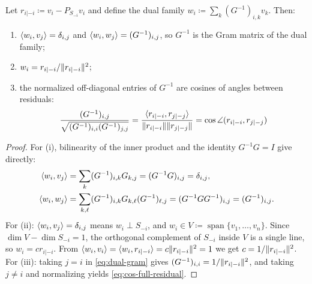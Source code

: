 \documentclass{IEEEtran}
\begin{document}
\begin{lemma}\label{lem:dual-basis}
  Let $r_{i|-i} \coloneq v_{i} - P_{S_{-i}} v_{i}$ and define the dual family $w_{i} \coloneq \sum_{k} (G^{-1})_{i,k} v_{k}$. Then:
  \begin{enumerate}[label=(\roman*)]
    \item $\langle w_{i}, v_{j}\rangle = \delta_{i,j}$ and $\langle w_{i}, w_{j}\rangle = (G^{-1})_{i,j}$, so $G^{-1}$ is the Gram matrix of the dual family;
    \item $w_{i} = r_{i|-i}/\lVert r_{i|-i}\rVert^{2}$;
    \item the normalized off-diagonal entries of $G^{-1}$ are cosines of angles between residuals:
      \begin{equation}    \label{eq:cos-full-residual}
        \frac{(G^{-1})_{i,j}}{\sqrt{(G^{-1})_{i,i}(G^{-1})_{j,j}}}
        = \frac{\langle r_{i|-i}, r_{j|-j}\rangle}{\lVert r_{i|-i}\rVert\lVert r_{j|-j}\rVert}
        = \cos \angle (r_{i|-i}, r_{j|-j})
      \end{equation}
  \end{enumerate}
\end{lemma}
\begin{proof}
  For (i), bilinearity of the inner product and the identity $G^{-1}G = I$ give directly:
  \begin{align}
    \langle w_{i}, v_{j}\rangle
    &= \sum_{k} (G^{-1})_{i,k} G_{k,j} = (G^{-1} G)_{i,j} = \delta_{i,j},
    \label{eq:dual-biorth}\\
    \langle w_{i}, w_{j}\rangle
    &= \sum_{k,\ell} (G^{-1})_{i,k} G_{k,\ell} (G^{-1})_{\ell,j} = (G^{-1} G G^{-1})_{i,j} = (G^{-1})_{i,j}.
    \label{eq:dual-gram}
  \end{align}
  For (ii): $\langle w_{i}, v_{j}\rangle = \delta_{i,j}$ means $w_{i} \perp S_{-i}$, and $w_{i} \in V \coloneq \operatorname{span}\{v_{1},\ldots,v_{n}\}$. Since $\dim V - \dim S_{-i} = 1$, the orthogonal complement of $S_{-i}$ inside $V$ is a single line, so $w_{i} = c r_{i|-i}$. From $\langle w_{i}, v_{i}\rangle = \langle w_{i}, r_{i|-i}\rangle = c\lVert r_{i|-i}\rVert^{2} = 1$ we get $c = 1/\lVert r_{i|-i}\rVert^{2}$. For (iii): taking $j = i$ in \eqref{eq:dual-gram} gives $(G^{-1})_{i,i} = 1/\lVert r_{i|-i}\rVert^{2}$, and taking $j \neq i$ and normalizing yields \eqref{eq:cos-full-residual}.
\end{proof}
\end{document}
